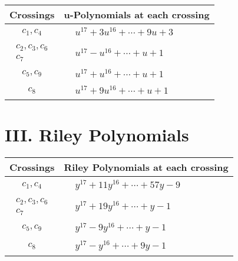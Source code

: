\documentclass[1p]{elsarticle_modified}
\theoremstyle{definition}
\begin{document}
\begin{tabular}{m{50pt}|m{274pt}}
Crossings & \hspace{64pt}u-Polynomials at each crossing \\
\hline $$\begin{aligned}c_{1},c_{4}\end{aligned}$$&$\begin{aligned}
&u^{17}+3 u^{16}+\cdots+9 u+3
\end{aligned}$\\
\hline $$\begin{aligned}c_{2},c_{3},c_{6}\\c_{7}\end{aligned}$$&$\begin{aligned}
&u^{17}- u^{16}+\cdots+u+1
\end{aligned}$\\
\hline $$\begin{aligned}c_{5},c_{9}\end{aligned}$$&$\begin{aligned}
&u^{17}+u^{16}+\cdots+u+1
\end{aligned}$\\
\hline $$\begin{aligned}c_{8}\end{aligned}$$&$\begin{aligned}
&u^{17}+9 u^{16}+\cdots+u+1
\end{aligned}$\\
\hline
\end{tabular}\newpage\renewcommand{\arraystretch}{1}
\centering \section*{ III. Riley Polynomials}
\begin{tabular}{m{50pt}|m{274pt}}
Crossings & \hspace{64pt}Riley Polynomials at each crossing \\
\hline $$\begin{aligned}c_{1},c_{4}\end{aligned}$$&$\begin{aligned}
&y^{17}+11 y^{16}+\cdots+57 y-9
\end{aligned}$\\
\hline $$\begin{aligned}c_{2},c_{3},c_{6}\\c_{7}\end{aligned}$$&$\begin{aligned}
&y^{17}+19 y^{16}+\cdots+y-1
\end{aligned}$\\
\hline $$\begin{aligned}c_{5},c_{9}\end{aligned}$$&$\begin{aligned}
&y^{17}-9 y^{16}+\cdots+y-1
\end{aligned}$\\
\hline $$\begin{aligned}c_{8}\end{aligned}$$&$\begin{aligned}
&y^{17}- y^{16}+\cdots+9 y-1
\end{aligned}$\\
\hline
\end{tabular}
\vskip 2pc
\end{document}
